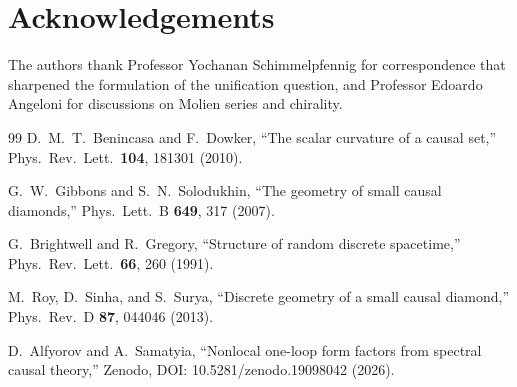 \documentclass[12pt,a4paper]{article}
\begin{document}
\section*{Acknowledgements}

The authors thank Professor Yochanan Schimmelpfennig for correspondence that sharpened the formulation of the unification question, and Professor Edoardo Angeloni for discussions on Molien series and chirality.

\begin{thebibliography}{99}
 D.~M.~T.~Benincasa and F.~Dowker,
  ``The scalar curvature of a causal set,''
  Phys.\ Rev.\ Lett.\ \textbf{104}, 181301 (2010).

 G.~W.~Gibbons and S.~N.~Solodukhin,
  ``The geometry of small causal diamonds,''
  Phys.\ Lett.\ B \textbf{649}, 317 (2007).

 G.~Brightwell and R.~Gregory,
  ``Structure of random discrete spacetime,''
  Phys.\ Rev.\ Lett.\ \textbf{66}, 260 (1991).

 M.~Roy, D.~Sinha, and S.~Surya,
  ``Discrete geometry of a small causal diamond,''
  Phys.\ Rev.\ D \textbf{87}, 044046 (2013).

 D.~Alfyorov and A.~Samatyia,
  ``Nonlocal one-loop form factors from spectral causal theory,''
  Zenodo, DOI: 10.5281/zenodo.19098042 (2026).
\end{thebibliography}
\end{document}
